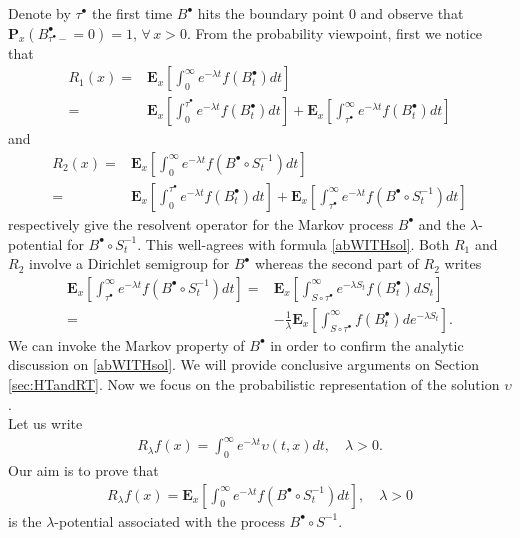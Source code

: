 \documentclass[11pt,a4paper]{article}
\theoremstyle{plain}
\theoremstyle{definition}
\theoremstyle{remark}
\begin{document}
		
		Denote by $\tau^\bullet$ the first time $B^\bullet$ hits the boundary point $0$ and observe that $\mathbf{P}_x(B^\bullet_{\tau^\bullet-}=0)=1$, $\forall\, x>0$. From the probability viewpoint, first we notice that 
		\begin{align*}
			R_1(x) 
			= & \mathbf{E}_x \left[ \int_0^\infty e^{-\lambda t} f(B^\bullet_t) dt \right]\\ 
			= & \mathbf{E}_x \left[ \int_0^{\tau^\bullet} e^{-\lambda t} f(B^\bullet_t) dt \right] + \mathbf{E}_x \left[ \int_{\tau^\bullet}^\infty e^{-\lambda t} f(B^\bullet_t) dt \right]
		\end{align*}
		and
		\begin{align*}
			R_2(x) 
			= & \mathbf{E}_x \left[ \int_0^\infty e^{-\lambda t} f(B^\bullet \circ S^{-1}_t) dt \right]\\ 
			= & \mathbf{E}_x \left[ \int_0^{\tau^\bullet} e^{-\lambda t} f(B^\bullet_t) dt \right] + \mathbf{E}_x \left[ \int_{\tau^\bullet}^\infty e^{-\lambda t} f(B^\bullet \circ S^{-1}_t) dt \right]
		\end{align*}
		respectively give the resolvent operator for the Markov process $B^\bullet$ and the $\lambda$-potential for $B^\bullet \circ S^{-1}_t$. This well-agrees with formula \eqref{abWITHsol}. Both $R_1$ and $R_2$ involve a Dirichlet semigroup for $B^\bullet$ whereas the second part of $R_2$ writes
		\begin{align*}
			\mathbf{E}_x \left[ \int_{\tau^\bullet}^\infty e^{-\lambda t} f(B^\bullet \circ S^{-1}_t) dt \right] 
			= & \mathbf{E}_x \left[ \int_{S \circ \tau^\bullet}^\infty e^{-\lambda S_t} f(B^\bullet_t) dS_t \right]\\
			= & - \frac{1}{\lambda} \mathbf{E}_x \left[ \int_{S \circ \tau^\bullet}^\infty  f(B^\bullet_t) de^{-\lambda S_t} \right].
		\end{align*}
		We can invoke the Markov property of $B^\bullet$ in order to confirm the analytic discussion on \eqref{abWITHsol}. We will provide conclusive arguments on Section \ref{sec:HTandRT}. Now we focus on the probabilistic representation of the solution $\upsilon$.\\
		
		Let us write
		\begin{align}
			\label{upsilonASS}
			R_\lambda f(x) = \int_0^\infty e^{-\lambda t} \upsilon(t,x) dt, \quad \lambda >0.
		\end{align}		
		Our aim is to prove that
		\begin{align}
			\label{potentialASS}
			R_\lambda f(x)=\mathbf{E}_x\left[\int_0^\infty e^{-\lambda t} f(B^\bullet \circ S_t^{-1}) dt\right], \quad  \lambda >0
		\end{align}
		is the $\lambda$-potential associated with the process $B^\bullet \circ S^{-1}$.
		
\end{document}
